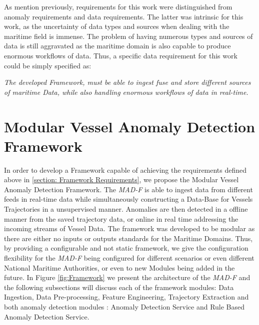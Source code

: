 As mention previously, requirements for this work were distinguished from anomaly requirements and data requirements. The latter was intrinsic for this work, as the uncertainty of data types and sources when dealing with the maritime field is immense. The problem of having numerous types and sources of data is still aggravated as the maritime domain is also capable to produce enormous workflows of data. Thus, a specific data requirement for this work could be simply specified as: 

\emph{The developed Framework, must be able to ingest fuse and store different sources of maritime Data, while also handling enormous workflows of data in real-time.}

\section{Modular Vessel Anomaly Detection Framework}
In order to develop a Framework capable of achieving the requirements defined above in \ref{section: Framework Requirements}, we propose the Modular Vessel Anomaly Detection Framework. The \emph{MAD-F} is able to ingest data from different feeds in real-time data while simultaneously constructing a Data-Base for Vessels Trajectories in a unsupervised manner. Anomalies are then detected in a offline manner from the saved trajectory data, or online in real time addressing the incoming streams of Vessel Data. 
The framework was developed to be modular as there are either no inputs or outputs standards for the Maritime Domains. Thus, by providing a configurable and not static framework, we give the configuration flexibility for the \emph{MAD-F} being configured for different scenarios or even different National Maritime Authorities, or even to new Modules being added in the future.
In Figure \ref{fig:Framework} we present the architecture of the \emph{MAD-F} and the following subsections will discuss each of the framework modules: Data Ingestion, Data Pre-processing, Feature Engineering, Trajectory Extraction and both anomaly detection modules : Anomaly Detection Service and Rule Based Anomaly Detection Service.

